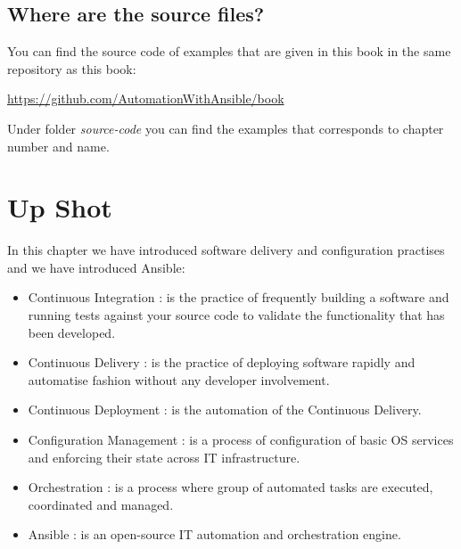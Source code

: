 \documentclass[10pt]{book}
\begin{document}
\subsection{Where are the source files?}
\label{sec:book-source-codes}
You can find the source code of examples that are given in this book 
in the same repository as this book:

\url{https://github.com/AutomationWithAnsible/book}

Under folder \emph{source-code} you can find the examples that corresponds to 
chapter number and name.

\section{Up Shot}
In this chapter we have introduced software delivery and configuration practises 
and we have introduced Ansible:

\begin{itemize}
\item Continuous Integration : is the practice of frequently building a software and running tests against 
your source code to validate the functionality that has been developed.

\item Continuous Delivery : is the practice of deploying software rapidly and 
automatise fashion without any developer involvement.

\item Continuous Deployment : is the automation of the Continuous Delivery. 

\item Configuration Management : is a process of configuration of basic OS 
services and enforcing their state across IT infrastructure. 

\item Orchestration : is a process where group of automated tasks are executed, 
coordinated and managed.

\item Ansible :  is an open-source IT automation and orchestration engine.

\end{itemize}







\end{document}
